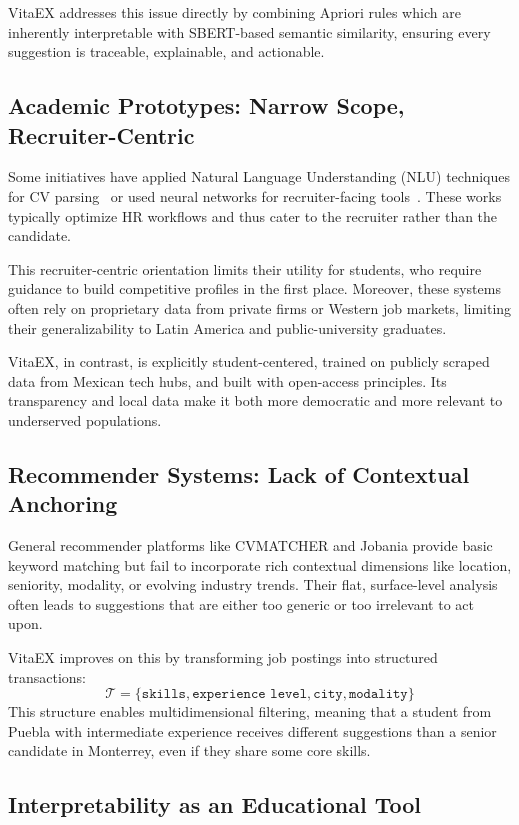 \documentclass[runningheads]{llncs}
\begin{document}
	VitaEX addresses this issue directly by combining Apriori rules which are inherently interpretable with SBERT-based semantic similarity, ensuring every suggestion is traceable, explainable, and actionable.
	
	\subsection{Academic Prototypes: Narrow Scope, Recruiter-Centric}
	
	Some initiatives have applied Natural Language Understanding (NLU) techniques for CV parsing~\cite{estadoarte1} or used neural networks for recruiter-facing tools~\cite{estadoarte4}. These works typically optimize HR workflows and thus cater to the recruiter rather than the candidate.
	
	This recruiter-centric orientation limits their utility for students, who require guidance to build competitive profiles in the first place. Moreover, these systems often rely on proprietary data from private firms or Western job markets, limiting their generalizability to Latin America and public-university graduates.
	
	VitaEX, in contrast, is explicitly student-centered, trained on publicly scraped data from Mexican tech hubs, and built with open-access principles. Its transparency and local data make it both more democratic and more relevant to underserved populations.
	
	\subsection{Recommender Systems: Lack of Contextual Anchoring}
	
	General recommender platforms like CVMATCHER and Jobania provide basic keyword matching but fail to incorporate rich contextual dimensions like location, seniority, modality, or evolving industry trends. Their flat, surface-level analysis often leads to suggestions that are either too generic or too irrelevant to act upon.
	
	VitaEX improves on this by transforming job postings into structured transactions:
	\[
	\mathcal{T} = \{\texttt{skills}, \texttt{experience level}, \texttt{city}, \texttt{modality}\}
	\]
	This structure enables multidimensional filtering, meaning that a student from Puebla with intermediate experience receives different suggestions than a senior candidate in Monterrey, even if they share some core skills.
	
	\subsection{Interpretability as an Educational Tool}
	
\end{document}
